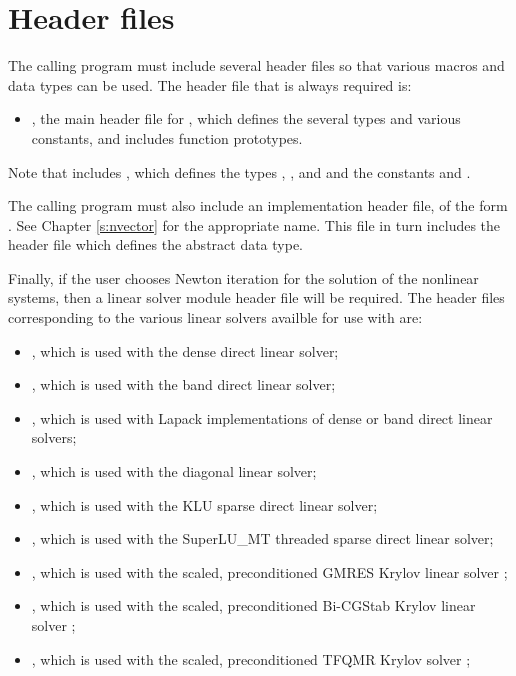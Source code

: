 \section{Header files}\label{ss:header_sim}
The calling program must include several header files so that various macros
and data types can be used. The header file that is always required is:
\begin{itemize}
\item  {}, 
  the main header file for {\cvodes}, which defines the several
  types and various constants, and includes function prototypes.
\end{itemize}
Note that  includes , 
which defines the types , , and 
and the constants  and .

The calling program must also include an {\nvector} implementation header file,
of the form .  See Chapter \ref{s:nvector} for the appropriate
name.  This file in turn includes the header file 
which defines the abstract  data type. 

Finally, if the user chooses Newton iteration for the solution of the nonlinear
systems, then a linear solver module header file will be required. 
The header files corresponding to the various linear solvers availble for use
with {\cvodes} are:
\begin{itemize}
\item {}, 
  which is used with the dense direct linear solver;

\item {}, 
  which is used with the band direct linear solver;

\item {},
  which is used with Lapack implementations of dense or band direct linear solvers;
  
\item {}, 
  which is used with the diagonal linear solver;

\item {}, 
  which is used with the KLU sparse direct linear solver;

\item {}, 
  which is used with the SuperLU\_MT threaded sparse direct linear solver;

\item {}, 
  which is used with the scaled, preconditioned GMRES Krylov linear solver {\spgmr};

\item {}, 
  which is used with the scaled, preconditioned Bi-CGStab Krylov linear solver {\spbcg};

\item {}, 
  which is used with the scaled, preconditioned TFQMR Krylov solver {\sptfqmr};
\end{itemize}

